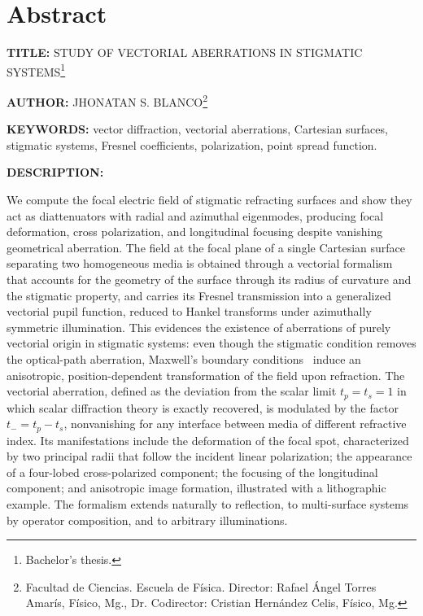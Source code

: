 \clearpage
\chapter*{Abstract}

\noindent\textbf{TITLE:} STUDY OF VECTORIAL ABERRATIONS IN STIGMATIC
SYSTEMS\footnote{Bachelor's thesis.}

\vspace{0.5em}
\noindent\textbf{AUTHOR:} JHONATAN S. BLANCO\footnote{Facultad de Ciencias.
Escuela de Física. Director: Rafael Ángel Torres Amarís, Físico, Mg., Dr.
Codirector: Cristian Hernández Celis, Físico, Mg.}

\vspace{0.5em}
\noindent\textbf{KEYWORDS:} vector diffraction, vectorial aberrations,
Cartesian surfaces, stigmatic systems, Fresnel coefficients, polarization,
point spread function.

\vspace{0.5em}
\noindent\textbf{DESCRIPTION:}

We compute the focal electric field of stigmatic refracting surfaces and show
they act as diattenuators with radial and azimuthal eigenmodes, producing
focal deformation, cross polarization, and longitudinal focusing despite
vanishing geometrical aberration. The field at the focal plane of a single
Cartesian surface separating two homogeneous media is obtained through a
vectorial formalism that accounts for the geometry of the surface through its
radius of curvature and the stigmatic property, and carries its Fresnel
transmission into a generalized vectorial pupil function, reduced to Hankel
transforms under azimuthally symmetric illumination. This evidences
the existence of aberrations of purely vectorial origin in stigmatic systems:
even though the stigmatic condition removes the optical-path aberration,
Maxwell's boundary conditions~\cite{jackson1999} induce an anisotropic, position-dependent
transformation of the field upon refraction. The vectorial aberration,
defined as the deviation from the scalar limit $t_p=t_s=1$ in which scalar
diffraction theory is exactly recovered, is modulated by the factor
$t_-=t_p-t_s$, nonvanishing for any interface between media of different
refractive index. Its manifestations include the deformation of the focal
spot, characterized by two principal radii that follow the incident linear
polarization; the appearance of a four-lobed cross-polarized component; the
focusing of the longitudinal component; and anisotropic image formation,
illustrated with a lithographic example. The formalism extends naturally to
reflection, to multi-surface systems by operator composition, and to
arbitrary illuminations.
